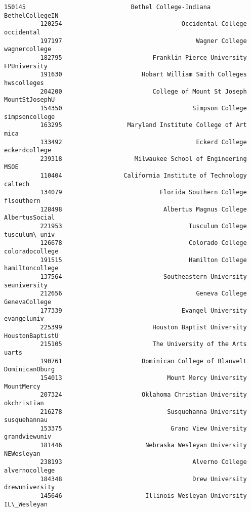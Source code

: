\documentclass[11pt]{article}
\begin{document}
\begin{Verbatim}[commandchars=\\\{\}]
          150145                             Bethel College-Indiana  BethelCollegeIN   
          120254                                 Occidental College       occidental   
          197197                                     Wagner College    wagnercollege   
          182795                         Franklin Pierce University     FPUniversity   
          191630                      Hobart William Smith Colleges      hwscolleges   
          204200                         College of Mount St Joseph   MountStJosephU   
          154350                                    Simpson College   simpsoncollege   
          163295                  Maryland Institute College of Art             mica   
          133492                                     Eckerd College    eckerdcollege   
          239318                    Milwaukee School of Engineering             MSOE   
          110404                 California Institute of Technology          caltech   
          134079                           Florida Southern College       flsouthern   
          128498                            Albertus Magnus College   AlbertusSocial   
          221953                                   Tusculum College    tusculum\_univ   
          126678                                   Colorado College  coloradocollege   
          191515                                   Hamilton College  hamiltoncollege   
          137564                            Southeastern University     seuniversity   
          212656                                     Geneva College    GenevaCollege   
          177339                                 Evangel University      evangeluniv   
          225399                         Houston Baptist University  HoustonBaptistU   
          215105                         The University of the Arts            uarts   
          190761                      Dominican College of Blauvelt   DominicanOburg   
          154013                             Mount Mercy University       MountMercy   
          207324                      Oklahoma Christian University      okchristian   
          216278                             Susquehanna University     susquehannau   
          153375                              Grand View University    grandviewuniv   
          181446                       Nebraska Wesleyan University       NEWesleyan   
          238193                                    Alverno College   alvernocollege   
          184348                                    Drew University   drewuniversity   
          145646                       Illinois Wesleyan University      IL\_Wesleyan   

\end{Verbatim}
\end{document}
